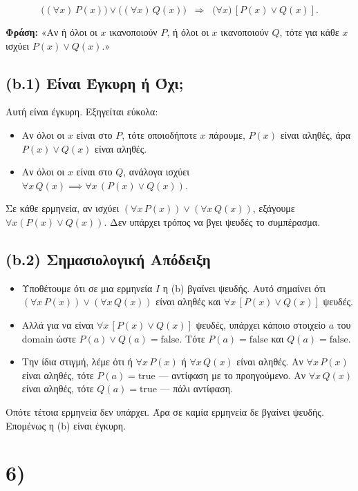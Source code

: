 \documentclass[a4paper,12pt]{article}
\begin{document}
\[
\bigl((\forall x)\,P(x)\bigr)\lor\bigl((\forall x)\,Q(x)\bigr) \;\;\Rightarrow\;\; \bigl(\forall x)\,[P(x)\lor Q(x)].
\]

\textbf{Φράση:} «Αν ή όλοι οι \(x\) ικανοποιούν \(P\), ή όλοι οι \(x\) ικανοποιούν \(Q\), τότε για κάθε \(x\) ισχύει \(P(x)\lor Q(x)\).»

\subsection*{(b.1) Είναι Έγκυρη ή Όχι;}

Αυτή είναι έγκυρη. Εξηγείται εύκολα:
\begin{itemize}
    \item Αν όλοι οι \(x\) είναι στο \(P\), τότε οποιοδήποτε \(x\) πάρουμε, \(P(x)\) είναι αληθές, άρα \(P(x)\lor Q(x)\) είναι αληθές.
    \item Αν όλοι οι \(x\) είναι στο \(Q\), ανάλογα ισχύει \(\forall x\,Q(x)\implies\forall x\,(P(x)\lor Q(x))\).
\end{itemize}
Σε κάθε ερμηνεία, αν ισχύει \((\forall x\,P(x))\lor(\forall x\,Q(x))\), εξάγουμε \(\forall x (P(x)\lor Q(x))\). Δεν υπάρχει τρόπος να βγει ψευδές το συμπέρασμα.

\subsection*{(b.2) Σημασιολογική Απόδειξη}

\begin{itemize}
    \item Υποθέτουμε ότι σε μια ερμηνεία \(I\) η (b) βγαίνει ψευδής. Αυτό σημαίνει ότι \((\forall x\,P(x))\lor(\forall x\,Q(x))\) είναι αληθές και \(\forall x\,[P(x)\lor Q(x)]\) ψευδές.
    \item Αλλά για να είναι \(\forall x\,[P(x)\lor Q(x)]\) ψευδές, υπάρχει κάποιο στοιχείο \(a\) του domain ώστε \(P(a)\lor Q(a) = \text{false}\). Τότε \(P(a)=\text{false}\) και \(Q(a)=\text{false}\).
    \item Την ίδια στιγμή, λέμε ότι ή \(\forall x\,P(x)\) ή \(\forall x\,Q(x)\) είναι αληθές. Αν \(\forall x\,P(x)\) είναι αληθές, τότε \(P(a)=\text{true}\) — αντίφαση με το προηγούμενο. Αν \(\forall x\,Q(x)\) είναι αληθές, τότε \(Q(a)=\text{true}\) — πάλι αντίφαση.
\end{itemize}

Οπότε τέτοια ερμηνεία δεν υπάρχει. Άρα σε καμία ερμηνεία δε βγαίνει ψευδής. Επομένως η (b) είναι έγκυρη.

\section*{6)}
\end{document}
